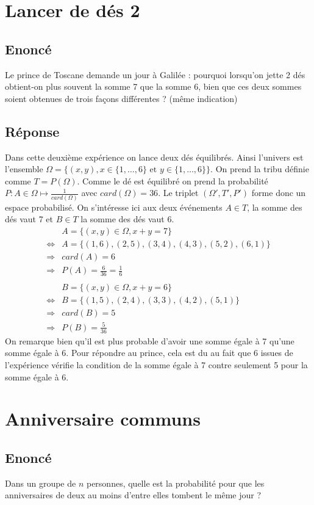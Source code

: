 \documentclass[10pt,a4paper,twoside]{article}
\begin{document}
\section{Lancer de dés 2}
\subsection*{Enoncé}
Le prince de Toscane demande un jour à Galilée : pourquoi lorsqu'on jette 2 dés obtient-on plus souvent la somme 7 que la somme 6, bien que ces deux sommes soient obtenues de trois façons différentes ? (même indication)

\subsection*{Réponse}
Dans cette deuxième expérience on lance deux dés équilibrés. Ainsi l'univers est l'ensemble $\Omega = \{(x,y), x\in \{1,\ldots,6\}\text{ et }y\in \{1,\ldots,6\}\}$. On prend la tribu définie comme $T=P(\Omega)$. Comme le dé est équilibré on prend la probabilité $P:A\in \Omega \mapsto \frac{1}{card(\Omega)}$ avec $card(\Omega)=36$. Le triplet $(\Omega',T',P')$ forme donc un espace probabilisé. On s'intéresse ici aux deux événements $A\in T$, la somme des dés vaut 7 et $B\in T$ la somme des dés vaut 6.
\begin{align*}
  & A=\{(x,y)\in \Omega, x+y=7\}\\
\Leftrightarrow & A=\{(1,6),(2,5),(3,4),(4,3),(5,2),(6,1)\}\\
\Rightarrow & card(A) = 6\\
\Rightarrow & P(A) = \frac{6}{36} = \frac{1}{6}\\
\\
& B=\{(x,y)\in \Omega, x+y=6\}\\
\Leftrightarrow & B=\{(1,5),(2,4),(3,3),(4,2),(5,1)\}\\
\Rightarrow & card(B) = 5\\
\Rightarrow & P(B) = \frac{5}{36}
\end{align*}  
On remarque bien qu'il est plus probable d'avoir une somme égale à 7 qu'une somme égale à 6. Pour répondre au prince, cela est du au fait que 6 issues de l'expérience vérifie la condition de la somme égale à 7 contre seulement 5 pour la somme égale à 6.

\section{Anniversaire communs}
\subsection*{Enoncé}
Dans un groupe de $n$ personnes, quelle est la probabilité pour que les anniversaires de deux au moins d'entre elles tombent le même jour ?
\end{document}

